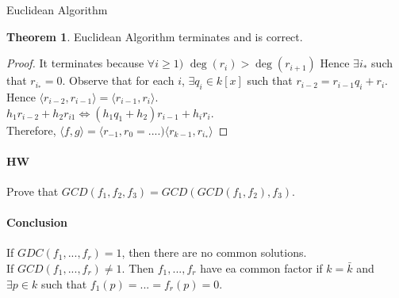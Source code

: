 \documentclass{article}
\theoremstyle{definition}
\newtheorem{thm}{Theorem}
\begin{document}
\begin{algorithm}[H]
\caption{Euclidean Algorithm}
	

 		\;
	\;
\end{algorithm}

\begin{thm}
	Euclidean Algorithm terminates and is correct.
\end{thm}
\begin{proof}
	It terminates because $\forall i\geq1)$ $\deg(r_i)>\deg(r_{i+1})$ Hence $\exists i_*$ such that $r_{i_*}=0$. Observe that for each $i$, $\exists q_i\in k[x]$ such that $r_{i-2}=r_{i-1}q_i+r_i$. Hence $\langle r_{i-2},r_{i-1}\rangle=\langle r_{i-1},r_i\rangle$.\\
	$h_1r_{i-2}+h_2r_{i1}\iff(h_1q_1+h_2)r_{i-1}+h_ir_i$.\\
	Therefore, $\langle f,g\rangle=\langle r_{-1},r_0=....)\langle r_{k-1},r_{i_*}\rangle$
\end{proof}
\paragraph{HW}
	Prove that $GCD(f_1,f_2,f_3)=GCD(GCD(f_1,f_2),f_3)$.
\paragraph{Conclusion} If $GDC(f_1,...,f_r)=1$, then there are no common solutions.\\
If $GCD(f_1,...,f_r)\neq 1$. Then $f_1,...,f_r$ have ea common factor if $k=\bar k$ and $\exists p\in k$ such that $f_1(p)=...=f_r(p)=0$.\par
\end{document}

